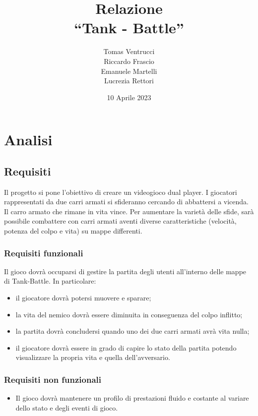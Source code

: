 \documentclass[a4paper,12pt]{report}
\title{Relazione \\``Tank - Battle''}
\author{Tomas Ventrucci \\Riccardo Frascio \\Emanuele Martelli \\Lucrezia Rettori}
\date{10 Aprile 2023}
\begin{document}
\maketitle

\tableofcontents

\chapter{Analisi}

\section{Requisiti}
Il progetto si pone l’obiettivo di creare un videogioco dual player. I giocatori rappresentati da due carri armati si sfideranno cercando di abbattersi a vicenda. Il carro armato che rimane in vita vince. Per aumentare la varietà delle sfide, sarà possibile combattere con carri armati aventi diverse caratteristiche (velocità, potenza del colpo e vita) su mappe differenti.

\subsection*{Requisiti funzionali}
Il gioco dovrà occuparsi di gestire la partita degli utenti all’interno delle mappe di Tank-Battle. In particolare:
    \begin{itemize}
        \item il giocatore dovrà potersi muovere e sparare;
        \item la vita del nemico dovrà essere diminuita in conseguenza del colpo inflitto;
        \item la partita dovrà concludersi quando uno dei due carri armati avrà vita nulla;
        \item il giocatore dovrà essere in grado di capire lo stato della partita potendo visualizzare la propria vita e quella dell'avversario.
    \end{itemize}
\subsection*{Requisiti non funzionali}
\begin{itemize}
	\item Il gioco dovrà mantenere un profilo di prestazioni fluido e costante al variare dello stato e degli eventi di gioco.
\end{itemize}
\newpage
\end{document}
